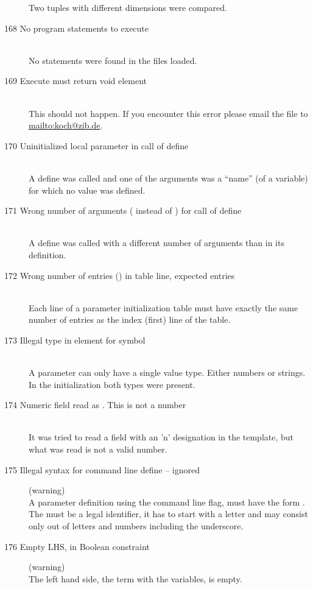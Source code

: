 \begin{description}
  Two tuples with different dimensions were compared.
%
%
\item[168 No program statements to execute]\ \\
  No \zimpl statements were found in the files loaded.
%
%
\item[169 Execute must return void element]\ \\
  This should not happen. If you encounter
  this error please email the  file to \url{mailto:koch@zib.de}.
%
%
\item[170 Uninitialized local parameter \code{xxx} in call of
  define \code{yyy}]\ \\
  A define was called and one of the arguments was a ``name'' 
  (of a variable) for which no value was defined.
\item[171 Wrong number of arguments (\code{xxx} instead of \code{yyy})
  for call of define \code{zzz}]\ \\
  A define was called with a different number of arguments than in
  its definition.
\item[172 Wrong number of entries (\code{xxx}) in table line, 
  expected \code{yyy} entries]\ \\
  Each line of a parameter initialization table must have
  exactly the same number of entries as the index (first) line of
  the table.
\item[173 Illegal type in element \code{xxx} for symbol]\ \\
  A parameter can only have a single value type. Either numbers or
  strings. In the initialization both types were present.
%
%
\item[174 Numeric field \code{xxx} read as \code{"yyy"}. This is not a
  number]\ \\
  It was tried to read a field with an 'n' designation in the template,
  but what was read is not a valid number.
%
%
\item[175 Illegal syntax for command line define \code{"xxx"} --
  ignored] (warning)\\
  A parameter definition using the command line  flag, must
  have the form . The  must be a legal
  identifier, \ie it has to start with a letter and may consist only out
  of letters and numbers including the underscore. 
%
%
\item[176 Empty LHS, in Boolean constraint] (warning)\ \\
   The left hand side, \ie the term with the variables, is empty. 

\end{description}
